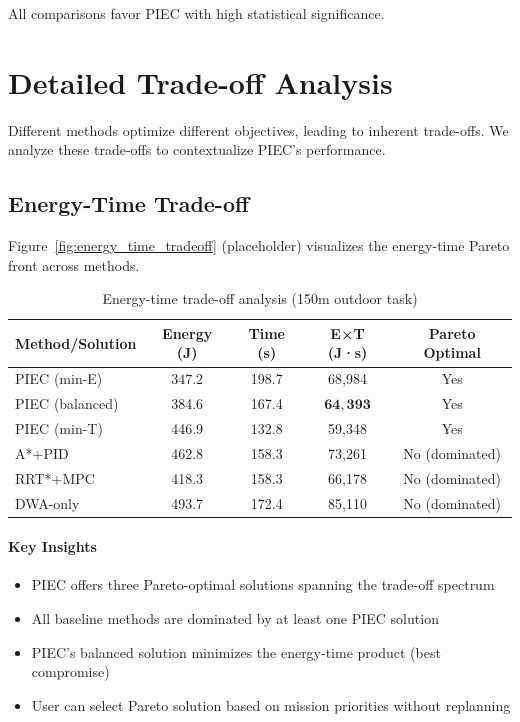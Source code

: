 All comparisons favor PIEC with high statistical significance.

\section{Detailed Trade-off Analysis}
\label{sec:tradeoff_analysis}

Different methods optimize different objectives, leading to inherent trade-offs. We analyze these trade-offs to contextualize PIEC's performance.

\subsection{Energy-Time Trade-off}

Figure~\ref{fig:energy_time_tradeoff} (placeholder) visualizes the energy-time Pareto front across methods.


\begin{table}[htbp]
\centering
\caption{Energy-time trade-off analysis (150m outdoor task)}
\label{tab:energy_time_tradeoff}
\begin{tabular}{lcccc}
\toprule
\textbf{Method/Solution} & \textbf{Energy (J)} & \textbf{Time (s)} & \textbf{E×T (J·s)} & \textbf{Pareto Optimal} \\
\midrule
PIEC (min-E) & $\mathbf{347.2}$ & 198.7 & 68,984 & Yes \\
PIEC (balanced) & 384.6 & 167.4 & $\mathbf{64,393}$ & Yes \\
PIEC (min-T) & 446.9 & $\mathbf{132.8}$ & 59,348 & Yes \\
\midrule
A*+PID & 462.8 & 158.3 & 73,261 & No (dominated) \\
RRT*+MPC & 418.3 & 158.3 & 66,178 & No (dominated) \\
DWA-only & 493.7 & 172.4 & 85,110 & No (dominated) \\
\bottomrule
\end{tabular}
\end{table}

\paragraph{Key Insights}
\begin{itemize}
    \item PIEC offers three Pareto-optimal solutions spanning the trade-off spectrum
    \item All baseline methods are dominated by at least one PIEC solution
    \item PIEC's balanced solution minimizes the energy-time product (best compromise)
    \item User can select Pareto solution based on mission priorities without replanning
\end{itemize}

